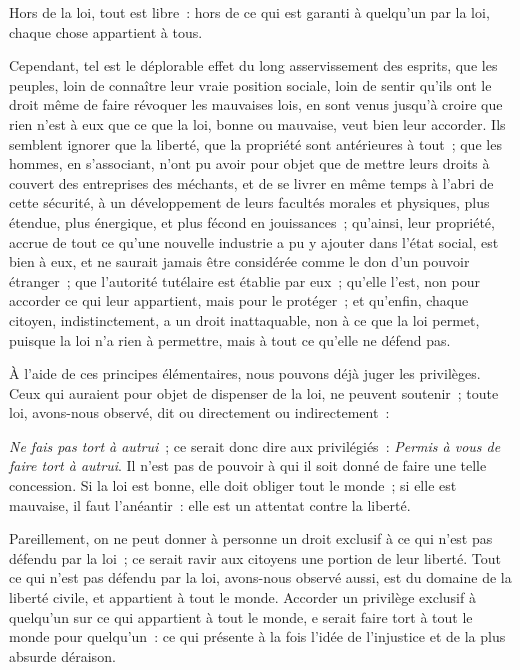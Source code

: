 \documentclass[french,twoside]{book} %
\begin{document}
Hors de la loi, tout est libre : hors de ce qui est garanti à quelqu’un par la loi, chaque chose appartient à tous.\par
Cependant, tel est le déplorable effet du long asservissement des esprits, que les peuples, loin de connaître leur vraie position sociale, loin de sentir qu’ils ont le droit même de faire révoquer les mauvaises lois, en sont venus jusqu’à croire que rien n’est à eux que ce que la loi, bonne ou mauvaise, veut bien leur accorder. Ils semblent ignorer que la liberté, que la propriété sont antérieures à tout ; que les hommes, en s’associant, n’ont pu avoir pour objet que de mettre leurs droits à couvert des entreprises des méchants, et de se livrer en même temps à l’abri de cette sécurité, à un développement de leurs facultés morales et physiques, plus étendue, plus énergique, et plus fécond en jouissances ; qu’ainsi, leur propriété, accrue de tout ce qu’une nouvelle industrie a pu y ajouter dans l’état social, est bien à eux, et ne saurait jamais être considérée comme le don d’un pouvoir étranger ; que l’autorité tutélaire est établie par eux ; qu’elle l’est, non pour accorder ce qui leur appartient, mais pour le protéger ; et qu’enfin, chaque citoyen, indistinctement, a un droit inattaquable, non à ce que la loi permet, puisque la loi n’a rien à permettre, mais à tout ce qu’elle ne défend pas.\par
À l’aide de ces principes élémentaires, nous pouvons déjà juger les privilèges. Ceux qui auraient pour objet de dispenser de la loi, ne peuvent soutenir ; toute loi, avons-nous observé, dit ou directement ou indirectement :\par
{\itshape Ne fais pas tort à autrui} ; ce serait donc dire aux privilégiés : {\itshape Permis à vous de faire tort à autrui}. Il n’est pas de pouvoir à qui il soit donné de faire une telle concession. Si la loi est bonne, elle doit obliger tout le monde ; si elle est mauvaise, il faut l’anéantir : elle est un attentat contre la liberté.\par
Pareillement, on ne peut donner à personne un droit exclusif à ce qui n’est pas défendu par la loi ; ce serait ravir aux citoyens une portion de leur liberté. Tout ce qui n’est pas défendu par la loi, avons-nous observé aussi, est du domaine de la liberté civile, et appartient à tout le monde. Accorder un privilège exclusif à quelqu’un sur ce qui appartient à tout le monde, e serait faire tort à tout le monde pour quelqu’un : ce qui présente à la fois l’idée de l’injustice et de la plus absurde déraison.\par
\end{document}
